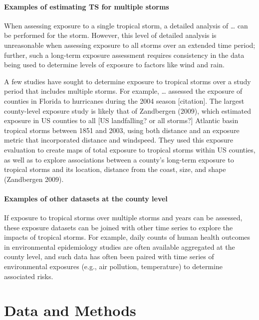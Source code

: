 \documentclass[]{elsarticle} %
\begin{document}
\paragraph{Examples of estimating TS for multiple
storms}\label{examples-of-estimating-ts-for-multiple-storms}

When assessing exposure to a single tropical storm, a detailed analysis
of \ldots{} can be performed for the storm. However, this level of
detailed analysis is unreasonable when assessing exposure to all storms
over an extended time period; further, such a long-term exposure
assessment requires consistency in the data being used to determine
levels of exposure to factors like wind and rain.

A few studies have sought to determine exposure to tropical storms over
a study period that includes multiple storms. For example, \ldots{}
assessed the exposure of counties in Florida to hurricanes during the
2004 season {[}citation{]}. The largest county-level exposure study is
likely that of Zandbergen (2009), which estimated exposure in US
counties to all {[}US landfalling? or all storms?{]} Atlantic basin
tropical storms between 1851 and 2003, using both distance and an
exposure metric that incorporated distance and windspeed. They used this
exposure evaluation to create maps of total exposure to tropical storms
within US counties, as well as to explore associations between a
county's long-term exposure to tropical storms and its location,
distance from the coast, size, and shape (Zandbergen 2009).

\paragraph{Examples of other datasets at the county
level}\label{examples-of-other-datasets-at-the-county-level}

If exposure to tropical storms over multiple storms and years can be
assessed, these exposure datasets can be joined with other time series
to explore the impacts of tropical storms. For example, daily counts of
human health outcomes in environmental epidemiology studies are often
available aggregated at the county level, and such data has often been
paired with time series of environmental exposures (e.g., air pollution,
temperature) to determine associated risks.

\section{Data and Methods}\label{data-and-methods}
\end{document}
